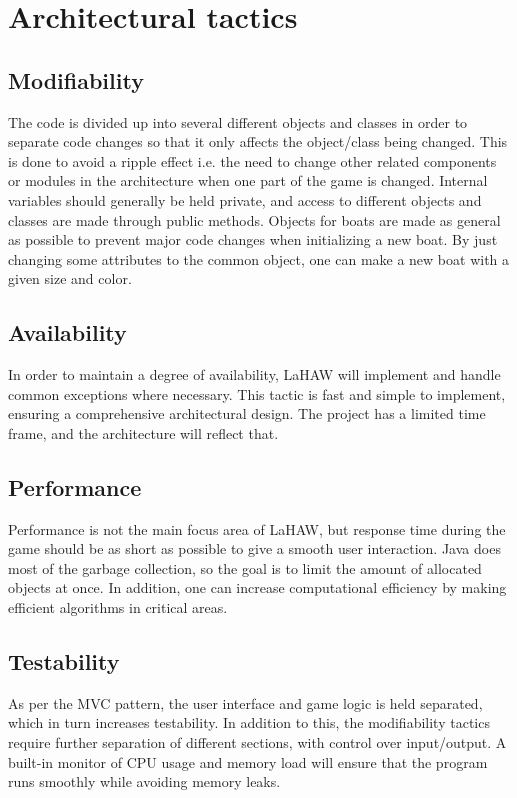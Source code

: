 \chapter{Architectural tactics}

    \section{Modifiability}
    The code is divided up into several different objects and classes in order to separate code changes so that it only affects the object/class being changed. This is done to avoid a ripple effect i.e. the need to change other related components or modules in the architecture when one part of the game is changed\cite[p.~107]{pensum}. Internal variables should generally be held private, and access to different objects and classes are made through public methods. Objects for boats are made as general as possible to prevent major code changes when initializing a new boat. By just changing some attributes to the common object, one can make a new boat with a given size and color. 
    
    \section{Availability}
    \label{avail}
    In order to maintain a degree of availability, LaHAW will implement and handle common exceptions where necessary. This tactic is fast and simple to implement, ensuring a comprehensive architectural design. The project has a limited time frame, and the architecture will reflect that.
    
    \section{Performance}
    Performance is not the main focus area of LaHAW, but response time during the game should be as short as possible to give a smooth user interaction. Java does most of the garbage collection, so the goal is to limit the amount of allocated objects at once. In addition, one can increase computational efficiency by making efficient algorithms in critical areas. 
    
    \section{Testability}
    \label{test}
    As per the MVC pattern, the user interface and game logic is held separated, which in turn increases testability. In addition to this, the modifiability tactics require further separation of different sections, with control over input/output. A built-in monitor of CPU usage and memory load will ensure that the program runs smoothly while avoiding memory leaks.
    
